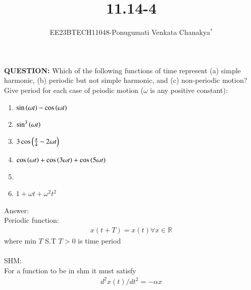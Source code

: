 \documentclass[journal,12pt,twocolumn]{IEEEtran}
\theoremstyle{remark}
\begin{document}
 
 \vspace{3cm}
 \title{\textbf{11.14-4}}
 \author{EE23BTECH11048-Ponugumati Venkata Chanakya$^{*}$%
 }
 \maketitle
 \newpage
 \bigskip
 \renewcommand{\thefigure}{\theenumi}
 \renewcommand{\thetable}{\theenumi}
 \textbf{QUESTION:}
 Which of the following functions of time represent (a) simple harmonic, (b) periodic
 but not simple harmonic, and (c) non-periodic motion? Give period for each case of
 peiodic motion ($\omega$ is any positive constant):\\
 \begin{enumerate}
 \item $\sin\left(\omega t\right)-\cos\left(\omega t\right)$\\
 \item $\sin^3\left(\omega t\right)$\\
 \item $3\cos\left(\frac{\pi}{4}- 2\omega t\right)$\\
 \item $\cos\left(\omega t\right)+\cos\left(3\omega t\right)+\cos\left(5\omega t\right)$\\
 \item {}\\
 \item $1+\omega t+\omega^2 t^2$\\
  \end{enumerate}
 Answer:\\
   Periodic function:
   \begin{align}
x(t+T) = x(t) \forall x \in \mathbb{R}
\end{align}
 where min $T$ S.T $T>0$ is time period\\
 \\
    SHM:\\
    For a function to be in shm it must satisfy 
    \begin{align}
   d^2 x(t) / dt^2 = - \alpha x\\
      \end{align}
\end{document}
